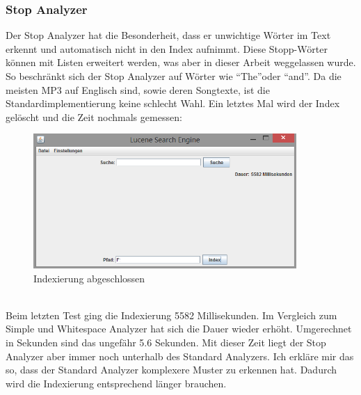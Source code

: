 \documentclass[12pt,a4paper,ngerman]{report}
\begin{document}
\subsubsection{Stop Analyzer}
Der Stop Analyzer hat die Besonderheit, dass er unwichtige Wörter im Text erkennt und automatisch nicht in den Index aufnimmt. Diese Stopp-Wörter können mit Listen erweitert werden, was aber in dieser Arbeit weggelassen wurde. So beschränkt sich der Stop Analyzer auf Wörter wie \textquotedblleft The\textquotedblright oder \textquotedblleft and\textquotedblright . Da die meisten MP3 auf Englisch sind, sowie deren Songtexte, ist die Standardimplementierung keine schlecht Wahl.
\newpage
Ein letztes Mal wird der Index gelöscht und die Zeit nochmals gemessen:
\begin{figure}[h!]
\centering
\includegraphics[width=10cm]{img/stop-analyzer-index.png}
\caption{Indexierung abgeschlossen\protect\footnotemark}
\end{figure}
\\
Beim letzten Test ging die Indexierung 5582 Millisekunden. Im Vergleich zum Simple und Whitespace Analyzer hat sich die Dauer wieder erhöht. Umgerechnet in Sekunden sind das ungefähr 5.6 Sekunden. Mit dieser Zeit liegt der Stop Analyzer aber immer noch unterhalb des Standard Analyzers. Ich erkläre mir das so, dass der Standard Analyzer komplexere Muster zu erkennen hat. Dadurch wird die Indexierung entsprechend länger brauchen.
\end{document}
